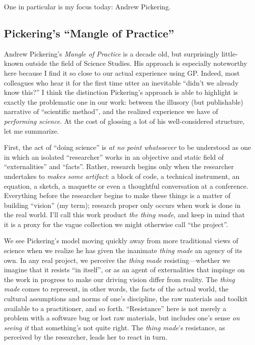 One in particular is my focus today: Andrew Pickering.

\subsection{Pickering's ``Mangle of Practice''}\hypertarget{pickerings-mangle-of-practice}{}\label{pickerings-mangle-of-practice}

Andrew Pickering's \emph{Mangle of Practice} is a decade old, but surprisingly little-known outside the field of Science Studies. His approach is especially noteworthy here because I find it so close to our actual experience using GP. Indeed, most colleagues who hear it for the first time utter an inevitable ``didn't we already know this?'' I think the distinction Pickering's approach is able to highlight is exactly the problematic one in our work: between the illusory (but publishable) narrative of ``scientific method'', and the realized experience we have of \emph{performing science}. At the cost of glossing a lot of his well-considered structure, let me summarize.

First, the act of ``doing science'' is \emph{at no point whatsoever} to be understood as one in which an isolated ``researcher'' works in an objective and static field of ``externalities'' and ``facts''. Rather, research begins only when the researcher undertakes to \emph{makes some artifact}: a block of code, a technical instrument, an equation, a sketch, a maquette or even a thoughtful conversation at a conference. Everything before the researcher begins to make these things is a matter of building ``vision'' (my term); research proper only occurs when work is done in the real world. I'll call this work product \emph{the thing made}, and keep in mind that it is a proxy for the vague collection we might otherwise call ``the project''.

We see Pickering's model moving quickly away from more traditional views of science when we realize he has given the inanimate \emph{thing made} an agency of its own. In any real project, we perceive the \emph{thing made} resisting---whether we imagine that it resists ``in itself'', or as an agent of externalities that impinge on the work in progress to make our driving vision differ from reality. The \emph{thing made} comes to represent, in other words, the facts of the actual world, the cultural assumptions and norms of one's discipline, the raw materials and toolkit available to a practitioner, and so forth. ``Resistance'' here is not merely a problem with a software bug or lost raw materials, but includes one's sense \emph{on seeing it} that something's not quite right. The \emph{thing made}'s resistance, as perceived by the researcher, leads her to react in turn.

